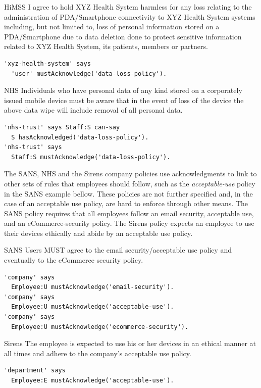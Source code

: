 \documentclass[thesis.tex]{subfiles}
\begin{document}
\begin{policyrule}{HiMSS}
  I agree to hold XYZ Health System harmless for any loss relating to the
  administration of PDA/Smartphone connectivity to XYZ Health System systems
  including, but not limited to, loss of personal information stored on a
  PDA/Smartphone due to data deletion done to protect sensitive information
  related to XYZ Health System, its patients, members or partners.
  \normalfont
  \begin{lstlisting}
'xyz-health-system' says
  'user' mustAcknowledge('data-loss-policy').
  \end{lstlisting}
\end{policyrule}

\noindent\begin{minipage}{\textwidth}
\begin{policyrule}{NHS}
  Individuals who have personal data of any kind stored on a corporately
  issued mobile device must be aware that in the event of loss of the device
  the above data wipe will include removal of all personal data.
  \normalfont
  \begin{lstlisting}
'nhs-trust' says Staff:S can-say
  S hasAcknowledged('data-loss-policy').
'nhs-trust' says
  Staff:S mustAcknowledge('data-loss-policy').
  \end{lstlisting}
\end{policyrule}
\end{minipage}

\vspace{1em}
The SANS, NHS and the Sirens company policies use acknowledgments to link to
other sets of rules that employees should follow, such as the
\emph{acceptable-use} policy in the SANS example bellow. These policies are not
further specified and, in the case of an acceptable use policy, are hard to
enforce through other means. The SANS policy requires that all employees follow
an email security, acceptable use, and an eCommerce-security policy. The Sirens
policy expects an employee to use their devices ethically and abide by an
acceptable use policy.

\begin{policyrule}{SANS}
  Users MUST agree to the email security/acceptable use policy and eventually to the eCommerce security policy.
  \begin{lstlisting}
'company' says
  Employee:U mustAcknowledge('email-security').
'company' says
  Employee:U mustAcknowledge('acceptable-use').
'company' says
  Employee:U mustAcknowledge('ecommerce-security').
  \end{lstlisting}
\end{policyrule}
\begin{policyrule}{Sirens}
  The employee is expected to use his or her devices in an ethical manner at all times and adhere to the company's acceptable use policy.
  \begin{lstlisting}
'department' says
  Employee:E mustAcknowledge('acceptable-use').
  \end{lstlisting}
\end{policyrule}
\end{document}
